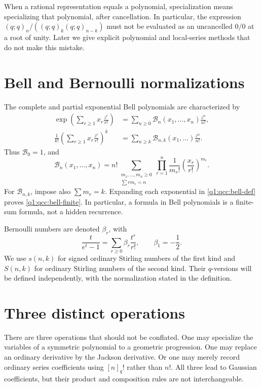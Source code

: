 \documentclass[11pt,a4paper,oneside,openany]{book}
\theoremstyle{definition}
\theoremstyle{remark}
\newcommand{\Y}[1]{\mathcal B_{#1}}
\newcommand{\B}[2]{\mathcal B_{#1,#2}}
\begin{document}
When a rational representation equals a polynomial, specialization means
specializing that polynomial, after cancellation. In particular, the expression
\((q;q)_n/((q;q)_k(q;q)_{n-k})\) must not be evaluated as an uncancelled
\(0/0\) at a root of unity. Later we give explicit polynomial and local-series
methods that do not make this mistake.

\section{Bell and Bernoulli normalizations}
The complete and partial exponential Bell polynomials are characterized by
\begin{align}
 \exp\left(\sum_{r\ge1}x_r\frac{z^r}{r!}\right)
 &=\sum_{n\ge0}\Y n(x_1,\ldots,x_n)\frac{z^n}{n!},\label{q1:qcc:bell-def}\\
 \frac1{k!}\left(\sum_{r\ge1}x_r\frac{z^r}{r!}\right)^k
 &=\sum_{n\ge k}\B nk(x_1,\ldots)\frac{z^n}{n!}.\label{q1:qcc:partial-def}
\end{align}
Thus \(\Y0=1\), and
\begin{equation}\label{q1:qcc:bell-finite}
 \Y n(x_1,\ldots,x_n)
 =n!\!\sum_{\substack{m_1,\ldots,m_n\ge0\\\sum r m_r=n}}
 \prod_{r=1}^n\frac1{m_r!}\left(\frac{x_r}{r!}\right)^{m_r}.
\end{equation}
For \(\B nk\), impose also \(\sum m_r=k\). Expanding each exponential in
\eqref{q1:qcc:bell-def} proves \eqref{q1:qcc:bell-finite}. In particular, a formula in
Bell polynomials is a finite-sum formula, not a hidden recurrence.

Bernoulli numbers are denoted \(\beta_r\), with
\begin{equation}\label{q1:qcc:bernoulli-def}
 \frac{t}{e^t-1}=\sum_{r\ge0}\beta_r\frac{t^r}{r!},
 \qquad \beta_1=-\frac12.
\end{equation}
We use \(s(n,k)\) for signed ordinary Stirling numbers of the first kind and
\(S(n,k)\) for ordinary Stirling numbers of the second kind. Their \(q\)-versions
will be defined independently, with the normalization stated in the definition.

\section{Three distinct operations}
There are three operations that should not be conflated. One may specialize the
variables of a symmetric polynomial to a geometric progression. One may replace
an ordinary derivative by the Jackson derivative. Or one may merely record
ordinary series coefficients using \([n]_q!\) rather than \(n!\). All three lead
to Gaussian coefficients, but their product and composition rules are not
interchangeable.
\end{document}

